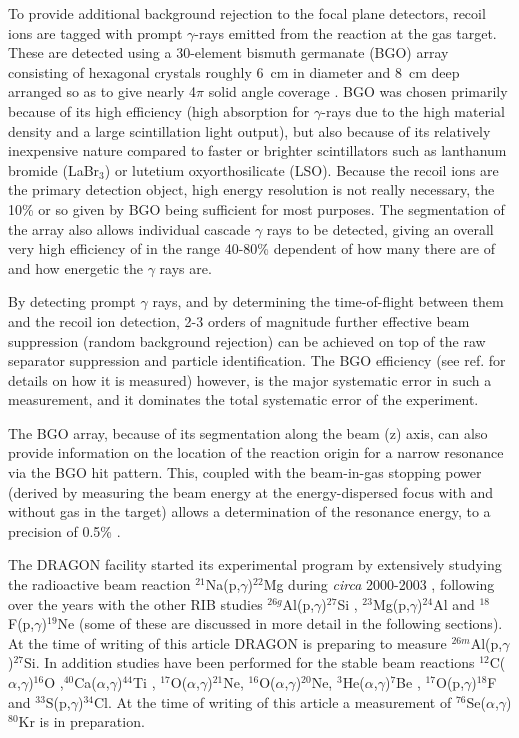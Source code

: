 To provide additional background rejection to the focal plane detectors, recoil ions are tagged with prompt $\gamma$-rays emitted from the reaction at the gas target. These are detected using a 30-element bismuth germanate (BGO) array consisting of hexagonal crystals roughly 6~cm in diameter and 8~cm deep arranged so as to give nearly 4$\pi$ solid angle coverage \cite{gig03}. BGO was chosen primarily because of its high efficiency (high absorption for $\gamma$-rays due to the high material density and a large scintillation light output), but also because of its relatively inexpensive nature compared to faster or brighter scintillators such as lanthanum bromide (LaBr$_{3}$) or lutetium oxyorthosilicate (LSO). Because the recoil ions are the primary detection object, high energy resolution is not really necessary, the 10\% or so given by BGO being sufficient for most purposes. The segmentation of the array also allows individual cascade $\gamma$ rays to be detected, giving an overall very high efficiency of in the range 40-80\% dependent of how many there are of and how energetic the $\gamma$ rays are. 

By detecting prompt $\gamma$ rays, and by determining the time-of-flight between them and the recoil ion detection, 2-3 orders of magnitude further effective beam suppression (random background rejection) can be achieved on top of the raw separator suppression and particle identification. The BGO efficiency (see ref. \cite{gig03} for details on how it is measured) however, is the major systematic error in such a measurement, and it dominates the total systematic error of the experiment.  

The BGO array, because of its segmentation along the beam (z) axis, can also provide information on the location of the reaction origin for a narrow resonance via the BGO hit pattern. This, coupled with the beam-in-gas stopping power (derived by measuring the beam energy at the energy-dispersed focus with and without gas in the target) allows a determination of the resonance energy, to a precision of 0.5\% \cite{hut12}.
 
The DRAGON facility started its experimental program by extensively studying the radioactive beam reaction $^{21}$Na(p,$\gamma$)$^{22}$Mg during {\em circa} 2000-2003 \cite{dau04}, following over the years with the other RIB studies  $^{26g}$Al(p,$\gamma$)$^{27}$Si \cite{rui06}, $^{23}$Mg(p,$\gamma$)$^{24}$Al \cite{eri10} and $^{18}$F(p,$\gamma$)$^{19}$Ne (some of these are discussed in more detail in the following sections). At the time of writing of this article DRAGON is preparing to measure $^{26m}$Al(p,$\gamma$)$^{27}$Si. In addition studies have been performed for the stable beam reactions $^{12}$C($\alpha$,$\gamma$)$^{16}$O \cite{mat06},$^{40}$Ca($\alpha$,$\gamma$)$^{44}$Ti \cite{voc07,voc08}, $^{17}$O($\alpha$,$\gamma$)$^{21}$Ne, $^{16}$O($\alpha$,$\gamma$)$^{20}$Ne, $^{3}$He($\alpha$,$\gamma$)$^{7}$Be \cite{sin12}, $^{17}$O(p,$\gamma$)$^{18}$F \cite{hag12} and $^{33}$S(p,$\gamma$)$^{34}$Cl. At the time of writing of this article a measurement of $^{76}$Se($\alpha$,$\gamma$)$^{80}$Kr is in preparation. 




 
